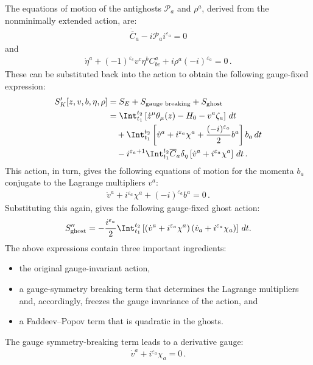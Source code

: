     The equations of motion of the antighosts $\mathcal{P}_a$ and $\rho^a$, derived from the nonminimally extended action, are:
    \begin{gather}
        \dot{\overline{C}}_a -i\mathcal{P}_ai^{\varepsilon_a}=0
    \end{gather}
    and
    \begin{gather}
        \dot{\eta}^a + (-1)^{\varepsilon_c}v^c\eta^bC^a_{bc}+i\rho^a(-i)^{\varepsilon_a}=0\,.
    \end{gather}
    These can be substituted back into the action to obtain the following gauge-fixed expression:
    \begin{gather}
        \label{constraint:FP_action}
        \begin{aligned}
            S'_K[z,v,b,\eta,\rho] &= S_E + S_{\text{gauge breaking}} + S_{\text{ghost}}\\
            &= \Int_{t_1}^{t_2}\left[\dot{z}^\mu\theta_\mu(z) - H_0 - v^a\zeta_a\right]\,dt\\
            &\quad+ \Int_{t_1}^{t_2}\left[\dot{v}^a+i^{\varepsilon_a}\chi^a+\frac{(-i)^{\varepsilon_a}}{2}b^a\right]b_a\,dt\\
            &\quad -i^{\varepsilon_a+1}\Int_{t_1}^{t_2}\overline{C}_a\delta_\eta\left[\dot{v}^a+i^{\varepsilon_a}\chi^a\right]\,dt\,.
        \end{aligned}
    \end{gather}
    This action, in turn, gives the following equations of motion for the momenta $b_a$ conjugate to the Lagrange multipliers $v^a$:
    \begin{gather}
        \dot{v}^a+i^{\varepsilon_a}\chi^a+(-i)^{\varepsilon_a}b^a = 0\,.
    \end{gather}
    Substituting this again, gives the following gauge-fixed ghost action:
    \begin{gather}
        S''_{\text{ghost}} = -\frac{i^{\varepsilon_a}}{2}\Int_{t_1}^{t_2}\left[\left(\dot{v}^a + i^{\varepsilon_a}\chi^a\right)\left(\dot{v}_a + i^{\varepsilon_a}\chi_a\right)\right]\,dt.
    \end{gather}
    The above expressions contain three important ingredients:
    \begin{itemize}
        \item the original gauge-invariant action,
        \item a gauge-symmetry breaking term that determines the Lagrange multipliers and, accordingly, freezes the gauge invariance of the action, and
        \item a Faddeev--Popov term that is quadratic in the ghosts.
    \end{itemize}
    The gauge symmetry-breaking term leads to a derivative gauge:
    \begin{gather}
        \label{constraint:derivative_gauge}
        \dot{v}^a + i^{\varepsilon_a}\chi_a = 0\,.
    \end{gather}


